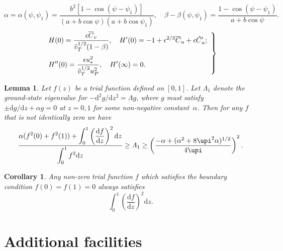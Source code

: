 \documentclass[lineno]{JFM-FLM_Au}
\newtheorem{lemma}{Lemma}
\newtheorem{corollary}{Corollary}
\begin{document}
\begin{equation}
\alpha = \alpha(\psi,\psi_1) = \frac{b^2[1-\cos(\psi-\psi_1)]}%
  {(a+b\cos\psi) (a+b\cos\psi_1)},
  \quad
  \beta - \beta(\psi,\psi_1) = \frac{1-\cos(\psi-\psi_1)}{a+b\cos\psi}.
\end{equation}
\begin{equation}
\left. \begin{array}{l}
\displaystyle
H(0) = \frac{\epsilon \overline{C}_v}{\tilde{v}^{{1}/{2}}_T
(1- \beta)},\quad H'(0) = -1+\epsilon^{{2}/{3}} \overline{C}_u
+ \epsilon \skew5\hat{C}_u'; \\[16pt]
\displaystyle
H''(0) = \frac{\epsilon u^2_{\ast}}{\tilde{v}^{{1}/{2}}
_T u^2_P},\quad H' (\infty) = 0.
\end{array} \right\}
\end{equation}
\begin{lemma}
Let $f(z)$ be a trial \citet[][pp.~231--232]{Batchelor59} function defined on $[0,1]$.  Let $\varLambda_1$ denote
the ground-state eigenvalue for $-\mathrm{d}^2g/\mathrm{d} z^2=\varLambda g$,
where $g$ must satisfy $\pm\mathrm{d} g/\mathrm{d} z+\alpha g=0$ at $z=0,1$
for some non-negative constant~$\alpha$.  Then for any $f$ that is not
identically zero we have
\begin{equation}
\frac{\displaystyle
  \alpha(f^2(0)+f^2(1)) + \int_0^1 \left(
  \frac{\mathrm{d} f}{\mathrm{d} z} \right)^2 \mathrm{d} z}%
  {\displaystyle \int_0^1 f^2\mathrm{d} z}
\ge \varLambda_1 \ge
\left( \frac{-\alpha+(\alpha^2+8\upi^2\alpha)^{1/2}}{4\upi} \right)^2.
\end{equation}
\end{lemma}
\begin{corollary}
Any non-zero trial function $f$ which satisfies the boundary condition
$f(0)=f(1)=0$ always satisfies
\begin{equation}
  \int_0^1 \left( \frac{\mathrm{d} f}{\mathrm{d} z} \right)^2 \mathrm{d} z.
\end{equation}
\end{corollary}


\section{Additional facilities}
\end{document}
